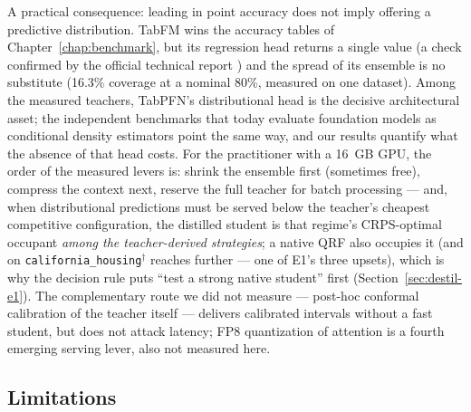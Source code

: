 A practical consequence: leading in point accuracy does not imply
offering a predictive distribution. TabFM wins the accuracy tables
of Chapter~\ref{chap:benchmark}, but its regression head returns a
single value (a check confirmed by the official technical report
\citep{kong2026}) and the spread of its ensemble is no substitute
(16.3\% coverage at a nominal 80\%, measured on one dataset). Among
the measured teachers, TabPFN's distributional head is the decisive
architectural asset; the independent benchmarks that today evaluate
foundation models as conditional density estimators
\citep{izbicki2026,landsgesell2026} point the same way, and our
results quantify what the absence of that head costs. For the
practitioner with a 16~GB GPU, the order of the measured levers is:
shrink the ensemble first (sometimes free), compress the context
next, reserve the full teacher for batch processing --- and, when
distributional predictions must be served below the teacher's
cheapest competitive configuration, the distilled student is that
regime's CRPS-optimal occupant \emph{among the teacher-derived
strategies}; a native QRF also occupies it (and on
\texttt{california\_\allowbreak housing}$^\dagger$ reaches further
--- one of E1's three upsets), which is why the decision rule puts
``test a strong native student'' first
(Section~\ref{sec:destil-e1}). The complementary route we did not
measure --- post-hoc conformal calibration of the teacher itself
\citep{park2026} --- delivers calibrated intervals without a fast
student, but does not attack latency; FP8 quantization of attention
\citep{kubler2026} is a fourth emerging serving lever, also not
measured here.

\subsection{Limitations}
\label{sec:destil-limitacoes}

